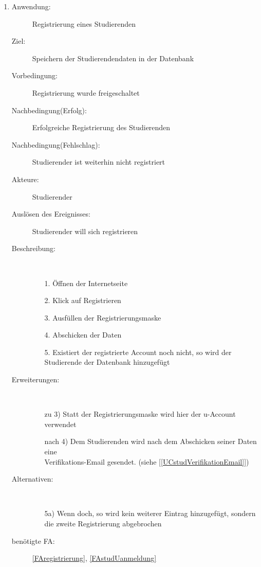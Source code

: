 \documentclass[parskip=full]{scrartcl}
\newcommand{\swtLabel}[1]{\textbf{/#1\arabic*0/}}
\newcommand{\testRef}[1]{[\ref{#1}]}
\begin{document}
\begin{enumerate}[label=\swtLabel{S}]
	\item \label{UCstudReg}
    \begin{description}
  	\item[Anwendung:] Registrierung eines Studierenden
  	\item[Ziel:] Speichern der Studierendendaten in der Datenbank
  	\item[Vorbedingung:] Registrierung wurde freigeschaltet
  	\item[Nachbedingung(Erfolg):] Erfolgreiche Registrierung des Studierenden
  	\item[Nachbedingung(Fehlschlag):] Studierender ist weiterhin nicht
  	registriert
  	\item[Akteure:] Studierender
  	\item[Auslösen des Ereignisses:] Studierender will sich registrieren
  	\item[Beschreibung:]~
  	\begin{enumerate}
  	  \item[1.] Öffnen der Internetseite
      \item[2.] Klick auf Registrieren
      \item[3.] Ausfüllen der Registrierungsmaske %
      \item[4.] Abschicken der Daten
      \item[5.] Existiert der registrierte Account noch nicht, so wird der
      Studierende der Datenbank hinzugefügt
  	\end{enumerate}
  	\item[Erweiterungen:]~
  	\begin{enumerate}
  	  \item[zu 3)] Statt der Registrierungsmaske wird hier der u-Account
  	  verwendet
  	  \item[nach 4)] Dem Studierenden wird nach dem Abschicken seiner Daten eine
  	  \\
  	  Verifikations-Email gesendet. (siehe \testRef{UCstudVerifikationEmail})
  	 \end{enumerate} 
  	\item[Alternativen:]~
  	\begin{enumerate}
  	  \item[5a)] Wenn doch, so wird kein weiterer Eintrag hinzugefügt, sondern
  	  die zweite Registrierung abgebrochen
  	\end{enumerate} 
  	\item[benötigte FA:] \ref{FAregistrierung}, \ref{FAstudUanmeldung}
  \end{description}
%   
  

\end{enumerate}
\end{document}
